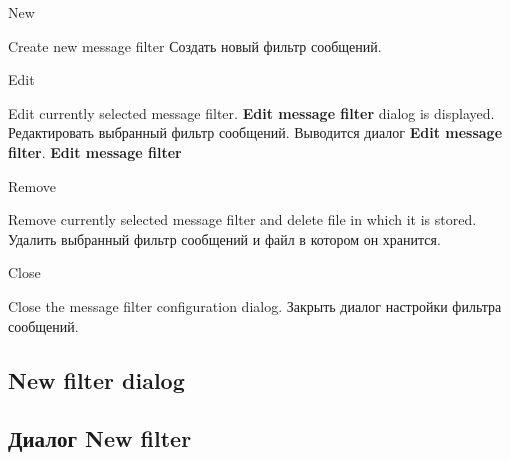 \begin{popup}
\caption{New}

\ifenglish
Create new message filter
\else
Создать новый фильтр сообщений. 
\fi
\end{popup}

\begin{popup}
\caption{Edit}

\ifenglish
Edit currently selected message filter. {\bf Edit message filter} dialog is
displayed.
\else
Редактировать выбранный фильтр сообщений. Выводится диалог {\bf Edit message filter}.
{\bf Edit message filter}
\fi
\end{popup}

\begin{popup}
\caption{Remove}

\ifenglish
Remove currently selected message filter and delete file in which it
is stored.
\else
Удалить выбранный фильтр сообщений и файл в котором он хранится.
\fi
\end{popup}

\begin{popup}
\caption{Close}

\ifenglish
Close the message filter configuration dialog.
\else
Закрыть диалог настройки фильтра сообщений. 
\fi
\end{popup}


\ifenglish
\subsection{New filter dialog}
\else
\subsection{Диалог New filter}
\fi
{}

